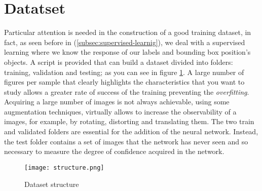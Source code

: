 \section{Datatset}
\label{sec:dataset}
Particular attention is needed in the construction of a good training dataset, 
in fact, as seen before in (\ref{subsec:supervised-learnig}), we deal with a 
supervised learning where we know the response of our labels and bounding box position's objects.
A script is provided that can build a dataset divided into folders: training, 
validation and testing; as you can see in figure \ref{fig:datasetstructure}.
A large number of figures per sample that clearly highlights the characteristics 
that you want to study allows a greater rate of success of the training 
preventing the \emph{overfitting}.
Acquiring a large number of images is not always achievable, using some 
augmentation techniques, virtually allows to increase the observability of a 
images, for example, by rotating, distorting and translating them.
The two train and validated folders are essential for the addition of the 
neural network.
Instead, the test folder contains a set of images that the network has never 
seen and so necessary to measure the degree of confidence acquired in the network.\linebreak
%
\begin{figure}[htb]
	\centering
	\texttt{[image: structure.png]}
	\caption{Dataset structure}
	\label{fig:datasetstructure}
\end{figure}
%
